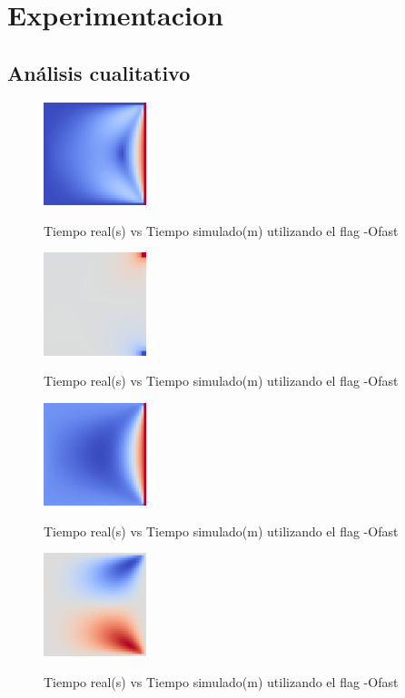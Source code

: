 \section{Experimentacion}

\subsection{Análisis cualitativo}

\begin{figure}[!htbp]
\caption{Tiempo real(s) vs Tiempo simulado(m) utilizando el flag -Ofast}
\includegraphics[width=3cm]{imagenes/small_norm.png}
\label{fig:small_norm}
\end{figure}

\begin{figure}[!htbp]
\caption{Tiempo real(s) vs Tiempo simulado(m) utilizando el flag -Ofast}
\includegraphics[width=3cm]{imagenes/small_p.png}
\label{fig:small_p}
\end{figure}

\begin{figure}[!htbp]
\caption{Tiempo real(s) vs Tiempo simulado(m) utilizando el flag -Ofast}
\includegraphics[width=3cm]{imagenes/small_u.png}
\label{fig:small_u}
\end{figure}

\begin{figure}[!htbp]
\caption{Tiempo real(s) vs Tiempo simulado(m) utilizando el flag -Ofast}
\includegraphics[width=3cm]{imagenes/small_v.png}
\label{fig:small_v}
\end{figure}


